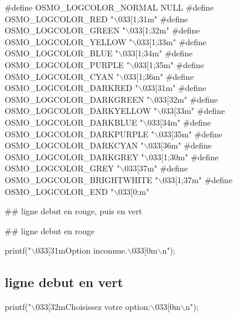 
\begin{DoxyCode}
\textcolor{preprocessor}{#define OSMO\_LOGCOLOR\_NORMAL NULL}
\textcolor{preprocessor}{#define OSMO\_LOGCOLOR\_RED "\(\backslash\)033[1;31m"}
\textcolor{preprocessor}{#define OSMO\_LOGCOLOR\_GREEN "\(\backslash\)033[1;32m"}
\textcolor{preprocessor}{#define OSMO\_LOGCOLOR\_YELLOW "\(\backslash\)033[1;33m"}
\textcolor{preprocessor}{#define OSMO\_LOGCOLOR\_BLUE "\(\backslash\)033[1;34m"}
\textcolor{preprocessor}{#define OSMO\_LOGCOLOR\_PURPLE "\(\backslash\)033[1;35m"}
\textcolor{preprocessor}{#define OSMO\_LOGCOLOR\_CYAN "\(\backslash\)033[1;36m"}
\textcolor{preprocessor}{#define OSMO\_LOGCOLOR\_DARKRED "\(\backslash\)033[31m"}
\textcolor{preprocessor}{#define OSMO\_LOGCOLOR\_DARKGREEN "\(\backslash\)033[32m"}
\textcolor{preprocessor}{#define OSMO\_LOGCOLOR\_DARKYELLOW "\(\backslash\)033[33m"}
\textcolor{preprocessor}{#define OSMO\_LOGCOLOR\_DARKBLUE "\(\backslash\)033[34m"}
\textcolor{preprocessor}{#define OSMO\_LOGCOLOR\_DARKPURPLE "\(\backslash\)033[35m"}
\textcolor{preprocessor}{#define OSMO\_LOGCOLOR\_DARKCYAN "\(\backslash\)033[36m"}
\textcolor{preprocessor}{#define OSMO\_LOGCOLOR\_DARKGREY "\(\backslash\)033[1;30m"}
\textcolor{preprocessor}{#define OSMO\_LOGCOLOR\_GREY "\(\backslash\)033[37m"}
\textcolor{preprocessor}{#define OSMO\_LOGCOLOR\_BRIGHTWHITE "\(\backslash\)033[1;37m"}
\textcolor{preprocessor}{#define OSMO\_LOGCOLOR\_END "\(\backslash\)033[0;m"}
\end{DoxyCode}


\#\# ligne debut en rouge, puis en vert 
\begin{DoxyCode}
printf(\textcolor{stringliteral}{"\(\backslash\)033[31m%
\end{DoxyCode}
 \#\# ligne debut en rouge 
\begin{DoxyCode}
printf(\textcolor{stringliteral}{"\(\backslash\)033[31mOption inconnue.\(\backslash\)033[0m\(\backslash\)n"});
\end{DoxyCode}
 \subsection*{ligne debut en vert}


\begin{DoxyCode}
printf(\textcolor{stringliteral}{"\(\backslash\)033[32mChoisissez votre option:\(\backslash\)033[0m\(\backslash\)n"});
\end{DoxyCode}
 